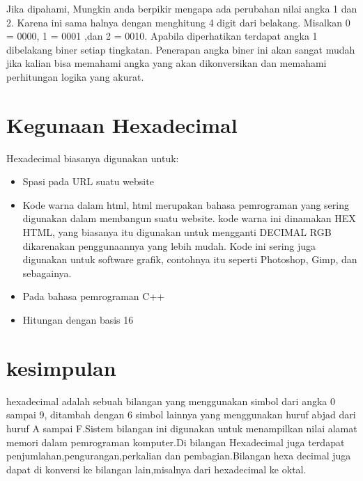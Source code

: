  Jika dipahami, Mungkin anda berpikir mengapa ada perubahan nilai angka 1 dan 2. Karena ini sama halnya dengan menghitung 4 digit dari belakang.
 Misalkan 0 = 0000, 1 = 0001 ,dan 2 = 0010. Apabila diperhatikan terdapat angka 1 dibelakang biner setiap tingkatan. Penerapan angka biner ini
 akan sangat mudah jika kalian bisa memahami angka yang akan dikonversikan dan memahami perhitungan logika yang akurat.

\section {Kegunaan Hexadecimal}
 Hexadecimal biasanya digunakan untuk:
 \begin{itemize}
   \item Spasi pada URL suatu website
   \item Kode warna dalam html, html merupakan bahasa pemrograman yang sering digunakan dalam membangun suatu website. kode warna ini dinamakan HEX HTML, yang biasanya itu digunakan untuk mengganti DECIMAL RGB dikarenakan penggunaannya yang lebih mudah. Kode ini sering juga digunakan untuk software grafik, contohnya itu seperti Photoshop, Gimp, dan sebagainya.
   \item Pada bahasa pemrograman C++
   \item Hitungan dengan basis 16
 \end{itemize}

\section{kesimpulan}
 hexadecimal adalah sebuah bilangan yang menggunakan simbol dari angka 0 sampai 9, ditambah dengan 6 simbol lainnya yang menggunakan huruf abjad dari huruf A sampai F.Sistem bilangan ini digunakan untuk menampilkan nilai alamat memori dalam pemrograman komputer.Di bilangan Hexadecimal juga terdapat penjumlahan,pengurangan,perkalian dan pembagian.Bilangan hexa decimal juga dapat di konversi ke bilangan lain,misalnya dari hexadecimal ke oktal.